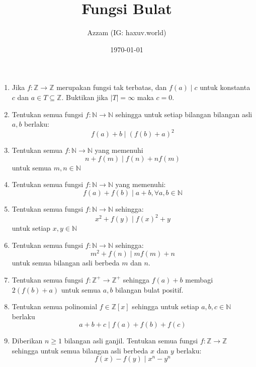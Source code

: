 \documentclass[12pt]{scrartcl}
\title{Fungsi Bulat}
\author{Azzam (IG: haxuv.world)}
\date{\today}
\begin{document}
\maketitle

\renewcommand*\contentsname{Daftar Isi}
\tableofcontents

\newpage
\begin{enumerate}
    \item Jika $f : \mathbb{Z} \to \mathbb{Z}$ merupakan fungsi tak terbatas, dan $f(a) \mid c$ untuk konstanta $c$ dan $a \in T \subseteq \mathbb{Z}$. Buktikan jika $|T| = \infty$ maka $c = 0$.
    
    \item Tentukan semua fungsi $f : \mathbb{N} \to \mathbb{N}$ sehingga untuk setiap bilangan bilangan asli $a, b$ berlaku:
    \[
    f(a)+b \mid (f(b)+a)^2
    \]
    
    \item Tentukan semua $f : \mathbb{N} \to \mathbb{N}$ yang memenuhi
    \[
    n+f(m) \mid f(n) + nf(m)
    \]
    untuk semua $m,n \in \mathbb{N}$
    
    \item Tentukan semua fungsi $f : \mathbb{N} \to \mathbb{N}$ yang memenuhi:
    \[
    f(a)+f(b) \mid a+b, \forall a,b \in \mathbb{N}
    \]
    
    \item Tentukan semua fungsi $f : \mathbb{N} \to \mathbb{N}$ sehingga:
    \[
    x^2+f(y) \mid f(x)^2 +y
    \]
    untuk setiap $x, y \in \mathbb{N}$
    
    \item Tentukan semua fungsi $f : \mathbb{N} \to \mathbb{N}$ sehingga:
    \[
    m^2+f(n) \mid mf(m)+n
    \]
    untuk semua bilangan asli berbeda $m$ dan $n$.
    
    \item Tentukan semua fungsi $f : \mathbb{Z}^+ \to \mathbb{Z}^+$ sehingga $f(a) + b$ membagi $2(f(b) + a)$ untuk semua $a, b$ bilangan bulat positif.
    
    \item Tentukan semua polinomial $f \in \mathbb{Z}[x]$ sehingga untuk setiap $a, b, c \in \mathbb{N}$ berlaku
    \[
    a+b+c \mid f(a)+f(b)+f(c)
    \]
    
    \item Diberikan $n \ge 1$ bilangan asli ganjil. Tentukan semua fungsi $f : \mathbb{Z} \to \mathbb{Z}$ sehingga untuk semua bilangan asli berbeda $x$ dan $y$ berlaku:
    \[
    f(x) - f(y) \mid x^n-y^n
    \]
    

\end{enumerate}
\end{document}

